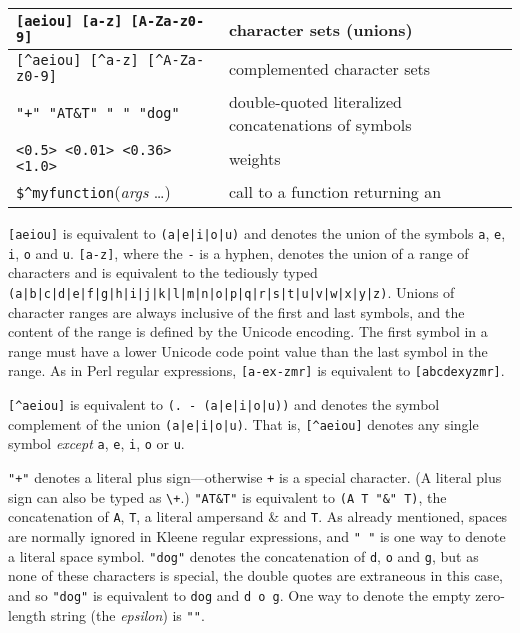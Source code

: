 \vspace{0.5cm}

\noindent
\begin{tabular}{|l|p{7.2cm}|}
\hline
\verb![aeiou] [a-z] [A-Za-z0-9]! & character sets (unions)\\
\hline
\verb![^aeiou] [^a-z] [^A-Za-z0-9]! & complemented character sets\\
\hline
\verb!"+" "AT&T" " " "dog"! & double-quoted literalized concatenations of symbols\\
\hline
\verb!<0.5> <0.01> <0.36> <1.0>! &  weights\\
\hline
\verb!$^myfunction!(\textit{args} \ldots) & call to a function returning
an \fsm{}\\
\hline
\end{tabular}

\vspace{0.5cm}

\texttt{[aeiou]} is equivalent to \texttt{(a|e|i|o|u)} and denotes the union of the
symbols \texttt{a}, \texttt{e}, \texttt{i}, \texttt{o} and \texttt{u}.  \texttt{[a-z]},
where the \texttt{-} is a hyphen, denotes the union of a range of characters and is
equivalent to the tediously typed
\texttt{(a|b|c|d|e|f|g|h|i|j|k|l|m|n|o|p|q|r|s|t|u|v|w|x|y|z)}.  Unions of character
ranges are always inclusive of the first and last symbols, and the content of the range
is defined by the Unicode encoding.  The first symbol in a range must have a lower
Unicode code point value than the last symbol in the range.  As in Perl regular
expressions, \texttt{[a-ex-zmr]} is equivalent to \texttt{[abcdexyzmr]}.

\texttt{[\^{}aeiou]} is equivalent to \texttt{(. - (a|e|i|o|u))} and denotes the symbol
complement of the union \texttt{(a|e|i|o|u)}.  That is, \texttt{[\^{}aeiou]} denotes any
single symbol \emph{except} \texttt{a}, \texttt{e}, \texttt{i}, \texttt{o} or \texttt{u}.

\texttt{"+"} denotes a literal plus sign---otherwise \texttt{+} is a special character.
(A literal plus sign can also be typed as \texttt{\textbackslash{}+}.)  \texttt{"AT\&T"} is equivalent
to \texttt{(A T "\&" T)}, the concatenation of \texttt{A}, \texttt{T}, a literal
ampersand \& and \texttt{T}.  As already mentioned, spaces are normally ignored in
Kleene regular expressions, and \texttt{"~"} is one way to denote a literal space
symbol.  \texttt{"dog"} denotes the concatenation of \texttt{d}, \texttt{o} and
\texttt{g}, but as none of these characters is special, the double quotes are
extraneous in this case, and so \texttt{"dog"} is equivalent to \texttt{dog} and
\texttt{d o g}.  One way to denote the empty zero-length string (the \emph{epsilon}) is \texttt{""}.

